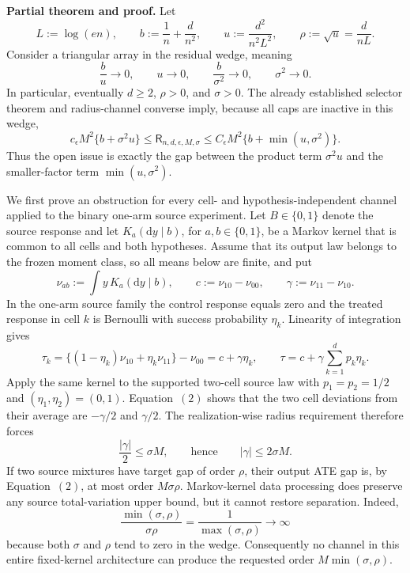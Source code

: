 \textbf{Partial theorem and proof.}
Let
\[
 L:=\log(en),\qquad
 b:=\frac1n+\frac d{n^2},\qquad
 u:=\frac{d^2}{n^2L^2},\qquad
 \rho:=\sqrt u=\frac d{nL}.
\]
Consider a triangular array in the residual wedge, meaning
\[
 \frac b u\longrightarrow0,\qquad u\longrightarrow0,
 \qquad \frac b{\sigma^2}\longrightarrow0,
 \qquad \sigma^2\longrightarrow0.
\]
In particular, eventually \(d\ge2\), \(\rho>0\), and \(\sigma>0\).
The already established selector theorem and radius-channel converse imply, because all caps are inactive in this wedge,
\[
 c_{\epsilon}M^2\{b+\sigma^2u\}
 \le \mathsf R_{n,d,\epsilon,M,\sigma}
 \le C_{\epsilon}M^2\{b+\min(u,\sigma^2)\}.
\tag{1}
\]
Thus the open issue is exactly the gap between the product term \(\sigma^2u\) and the smaller-factor term \(\min(u,\sigma^2)\).

We first prove an obstruction for every cell- and hypothesis-independent channel applied to the binary one-arm source experiment.  Let \(B\in\{0,1\}\) denote the source response and let \(K_a(\mathrm dy\mid b)\), for \(a,b\in\{0,1\}\), be a Markov kernel that is common to all cells and both hypotheses.  Assume that its output law belongs to the frozen moment class, so all means below are finite, and put
\[
 \nu_{ab}:=\int y\,K_a(\mathrm dy\mid b),
 \qquad c:=\nu_{10}-\nu_{00},
 \qquad \gamma:=\nu_{11}-\nu_{10}.
\]
In the one-arm source family the control response equals zero and the treated response in cell \(k\) is Bernoulli with success probability \(\eta_k\).  Linearity of integration gives
\[
 \tau_k
 =\{(1-\eta_k)\nu_{10}+\eta_k\nu_{11}\}-\nu_{00}
 =c+\gamma\eta_k,
 \qquad
 \tau=c+\gamma\sum_{k=1}^dp_k\eta_k.
\tag{2}
\]
Apply the same kernel to the supported two-cell source law with \(p_1=p_2=1/2\) and \((\eta_1,\eta_2)=(0,1)\).  Equation~\((2)\) shows that the two cell deviations from their average are \(-\gamma/2\) and \(\gamma/2\).  The realization-wise radius requirement therefore forces
\[
 \frac{|\gamma|}{2}\le\sigma M,
 \qquad\text{hence}\qquad
 |\gamma|\le2\sigma M.
\tag{3}
\]
If two source mixtures have target gap of order \(\rho\), their output ATE gap is, by Equation~\((2)\), at most order \(M\sigma\rho\).  Markov-kernel data processing does preserve any source total-variation upper bound, but it cannot restore separation.  Indeed,
\[
 \frac{\min(\sigma,\rho)}{\sigma\rho}
 =\frac1{\max(\sigma,\rho)}\longrightarrow\infty
\tag{4}
\]
because both \(\sigma\) and \(\rho\) tend to zero in the wedge.  Consequently no channel in this entire fixed-kernel architecture can produce the requested order \(M\min(\sigma,\rho)\).

